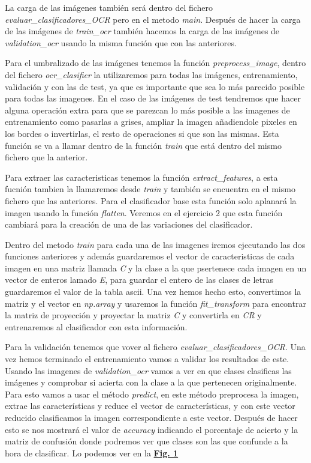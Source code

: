 \documentclass[a4paper, 12pt]{article}
\begin{document}
La carga de las imágenes también será dentro del fichero \textit{evaluar\_clasificadores\_OCR} pero en el metodo \textit{main}. Después de hacer la carga de las imágenes de \textit{train\_ocr} también hacemos la carga de las imágenes de \textit{validation\_ocr} usando la misma función que con las anteriores.  

Para el umbralizado de las imágenes tenemos la función \textit{preprocess\_image}, dentro del fichero \textit{ocr\_clasifier} la utilizaremos para todas las imágenes, entrenamiento, validación y con las de test, ya que es importante que sea lo más parecido posible para todas las imagenes. En el caso de las imágenes de test tendremos que hacer alguna operación extra para que se parezcan lo más posible a las imagenes de entrenamiento como pasarlas a grises, ampliar la imagen añadiendole pixeles en los bordes o invertirlas, el resto de operaciones si que son las mismas. Esta función se va a llamar dentro de la función \textit{train} que está dentro del mismo fichero que la anterior. 

Para extraer las caracteristicas tenemos la función \textit{extract\_features}, a esta fucnión tambien la llamaremos desde \textit{train} y también se encuentra en el mismo fichero que las anteriores. Para el clasificador base esta función solo aplanará la imagen usando la función \textit{flatten}. Veremos en el ejercicio 2 que esta función cambiará para la creación de una de las variaciones del clasificador.

Dentro del metodo \textit{train} para cada una de las imagenes iremos ejecutando las dos funciones anteriores y además guardaremos el vector de caracteristicas de cada imagen en una matriz llamada \textit{C} y la clase a la que psertenece cada imagen en un vector de enteros lamado \textit{E}, para guardar el entero de las clases de letras guardaremos el valor de la tabla ascii. Una vez hemos hecho esto, convertimos la matriz y el vector en \textit{np.array} y usaremos la función \textit{fit\_transform} para encontrar la matriz de proyección y proyectar la matriz \textit{C} y convertirla en \textit{CR} y entrenaremos al clasificador con esta información. 

Para la validación tenemos que vover al fichero \textit{evaluar\_clasificadores\_OCR}. Una vez hemos terminado el entrenamiento vamos a validar los resultados de este. Usando las imagenes de \textit{validation\_ocr} vamos a ver en que clases clasificas las imágenes y comprobar si acierta con la clase a la que pertenecen originalmente. Para esto vamos a usar el método \textit{predict}, en este método preprocesa la imagen, extrae las características y reduce el vector de características, y con este vector reducido clasificamos la imagen correspondiente a este vector. Después de hacer esto se nos mostrará el valor de \textit{accuracy} indicando el porcentaje de acierto y la matriz de confusión donde podremos ver que clases son las que confunde a la hora de clasificar. 
Lo podemos ver en la \textbf{\hyperref[fig:normalizacion]{Fig. 1}}
\end{document}
